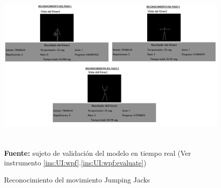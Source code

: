 \begin{figure}[H]
	\caption{Reconocimiento del movimiento Jumping Jacks}
	\label{fig:recognitionCheerleader}
	\centering
	\includegraphics[width=430px,height=320px]{graphics/resultados/recognitionCheerleader.png} \\
	\textbf{Fuente:} sujeto de validaci\'on del modelo en tiempo real (Ver instrumento \ref{ins:UI:wpf}.\ref{ins:UI:wpf:evaluate})
\end{figure}
